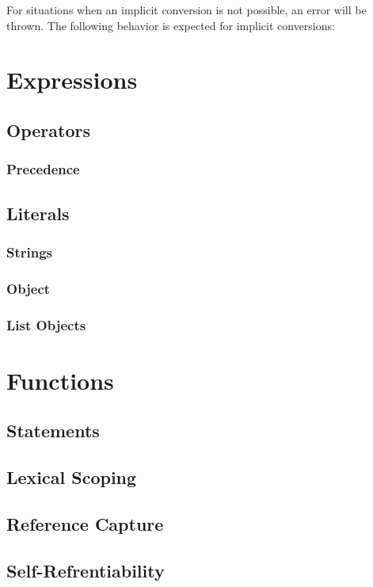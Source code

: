 \documentclass[12pt,letterpaper]{report}
\begin{document}
For situations when an implicit conversion is not possible, an error will be thrown.
The following behavior is expected for implicit conversions:




\chapter{Expressions}\label{Expressions}
\section{Operators}\label{Operators}
\subsection{Precedence}\label{Precedence}
\section{Literals}\label{Literals}
\subsection{Strings}\label{Strings}
\subsection{Object}\label{Object}
\subsection{List Objects}\label{List Objects}
\chapter{Functions}\label{Functions}
\section{Statements}\label{Statements}
\section{Lexical Scoping}\label{Lexical Scoping}
\section{Reference Capture}\label{Reference Capture}
\section{Self-Refrentiability}\label{Self-Refrentiability}
\end{document}
